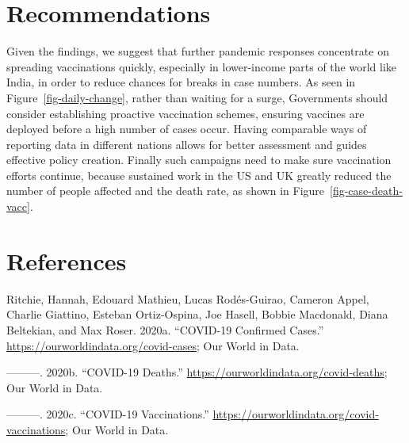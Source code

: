\documentclass[
  11pt,
]{article}
\newlength{\cslhangindent}
\newenvironment{CSLReferences}[2] %
 {\begin{list}{}{%
  \setlength{\itemindent}{0pt}
  \setlength{\leftmargin}{0pt}
  \setlength{\parsep}{0pt}
  \ifodd #1
   \setlength{\leftmargin}{\cslhangindent}
   \setlength{\itemindent}{-1\cslhangindent}
  \fi
  \setlength{\itemsep}{#2\baselineskip}}}
 {\end{list}}
\begin{document}
\section{Recommendations}\label{sec-recommendations}

Given the findings, we suggest that further pandemic responses
concentrate on spreading vaccinations quickly, especially in
lower-income parts of the world like India, in order to reduce chances
for breaks in case numbers. As seen in Figure~\ref{fig-daily-change},
rather than waiting for a surge, Governments should consider
establishing proactive vaccination schemes, ensuring vaccines are
deployed before a high number of cases occur. Having comparable ways of
reporting data in different nations allows for better assessment and
guides effective policy creation. Finally such campaigns need to make
sure vaccination efforts continue, because sustained work in the US and
UK greatly reduced the number of people affected and the death rate, as
shown in Figure~\ref{fig-case-death-vacc}.

\section{References}\label{sec-references}

\label{refs}
\begin{CSLReferences}{1}{0}
Ritchie, Hannah, Edouard Mathieu, Lucas Rodés-Guirao, Cameron Appel,
Charlie Giattino, Esteban Ortiz-Ospina, Joe Hasell, Bobbie Macdonald,
Diana Beltekian, and Max Roser. 2020a. {``COVID-19 Confirmed Cases.''}
\url{https://ourworldindata.org/covid-cases}; Our World in Data.

---------. 2020b. {``COVID-19 Deaths.''}
\url{https://ourworldindata.org/covid-deaths}; Our World in Data.

---------. 2020c. {``COVID-19 Vaccinations.''}
\url{https://ourworldindata.org/covid-vaccinations}; Our World in Data.

\end{CSLReferences}
\end{document}
